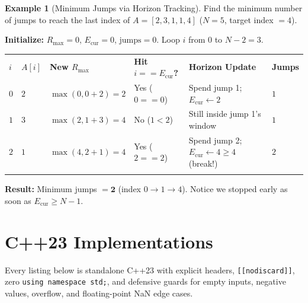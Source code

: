 \documentclass[11pt,a4paper]{article}
\theoremstyle{definition}
\newtheorem{example}{Example}[section]
\begin{document}
\begin{example}[Minimum Jumps via Horizon Tracking]
Find the minimum number of jumps to reach the last index of $A = [2, 3, 1, 1, 4]$ ($N = 5$, target index $= 4$).

\textbf{Initialize:} $R_{\max} = 0$, $E_{\text{cur}} = 0$, $\text{jumps} = 0$. Loop $i$ from $0$ to $N - 2 = 3$.

\begingroup\footnotesize{}
\begin{tabularx}{\textwidth}{>{\centering\arraybackslash}p{0.8cm} >{\centering\arraybackslash}p{1.2cm} >{\centering\arraybackslash}p{2.2cm} >{\centering\arraybackslash}p{2.3cm} >{\raggedright\arraybackslash}X >{\centering\arraybackslash}p{1.3cm}}
\arrayrulecolor{primaryblue}\toprule[1.1pt]
\rowcolor{primaryblue!10}
\textcolor{primaryblue}{\textbf{$i$}} & \textcolor{primaryblue}{\textbf{$A[i]$}} & \textcolor{primaryblue}{\textbf{New $R_{\max}$}} & \textcolor{primaryblue}{\textbf{Hit $i == E_{\text{cur}}$?}} & \textcolor{primaryblue}{\textbf{Horizon Update}} & \textcolor{primaryblue}{\textbf{Jumps}} \\
\arrayrulecolor{codeframe}\midrule[0.6pt]
$0$ & $2$ & $\max(0, 0{+}2) = 2$ & Yes ($0 == 0$) & Spend jump 1; $E_{\text{cur}} \leftarrow 2$ & $1$ \\
$1$ & $3$ & $\max(2, 1{+}3) = 4$ & No ($1 < 2$) & Still inside jump 1's window & $1$ \\
$2$ & $1$ & $\max(4, 2{+}1) = 4$ & Yes ($2 == 2$) & Spend jump 2; $E_{\text{cur}} \leftarrow 4 \ge 4$ (break!) & $2$ \\
\arrayrulecolor{primaryblue}\bottomrule[1.1pt]
\end{tabularx}\endgroup

\textbf{Result:} Minimum jumps $= \mathbf{2}$ (index $0 \to 1 \to 4$). Notice we stopped early as soon as $E_{\text{cur}} \ge N - 1$.
\end{example}

\section{C++23 Implementations}

Every listing below is standalone C++23 with explicit headers, \texttt{[[nodiscard]]}, zero \texttt{using namespace std;}, and defensive guards for empty inputs, negative values, overflow, and floating-point NaN edge cases.
\end{document}

